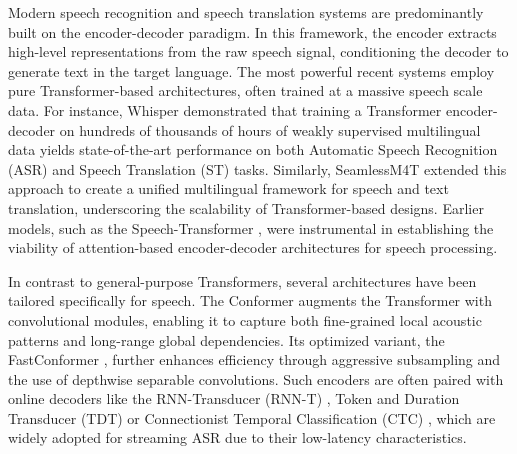 \label{sec:arch}
Modern speech recognition and speech translation systems are predominantly built on the encoder-decoder paradigm. In this framework, the encoder extracts high-level representations from the raw speech signal, conditioning the decoder to generate text in the target language. The most powerful recent systems employ pure Transformer-based architectures, often trained at a massive speech scale data. For instance, Whisper \cite{radford2023whisper} demonstrated that training a Transformer encoder-decoder on hundreds of thousands of hours of weakly supervised multilingual data yields state-of-the-art performance on both Automatic Speech Recognition (ASR) and Speech Translation (ST) tasks. Similarly, SeamlessM4T \cite{barrault2023seamlessm4t} extended this approach to create a unified multilingual framework for speech and text translation, underscoring the scalability of Transformer-based designs. Earlier models, such as the Speech-Transformer \cite{dong2018speech}, were instrumental in establishing the viability of attention-based encoder-decoder architectures for speech processing.

In contrast to general-purpose Transformers, several architectures have been tailored specifically for speech. The Conformer \cite{gulati2020conformer} augments the Transformer with convolutional modules, enabling it to capture both fine-grained local acoustic patterns and long-range global dependencies. Its optimized variant, the FastConformer \cite{rekesh2023fastconformer}, further enhances efficiency through aggressive subsampling and the use of depthwise separable convolutions. Such encoders are often paired with online decoders like the RNN-Transducer (RNN-T) \cite{jain2019rnntransducer}, Token and Duration Transducer (TDT)\cite{xu2023efficient} or Connectionist Temporal Classification (CTC) \cite{graves2006connectionist}, which are widely adopted for streaming ASR due to their low-latency characteristics.

